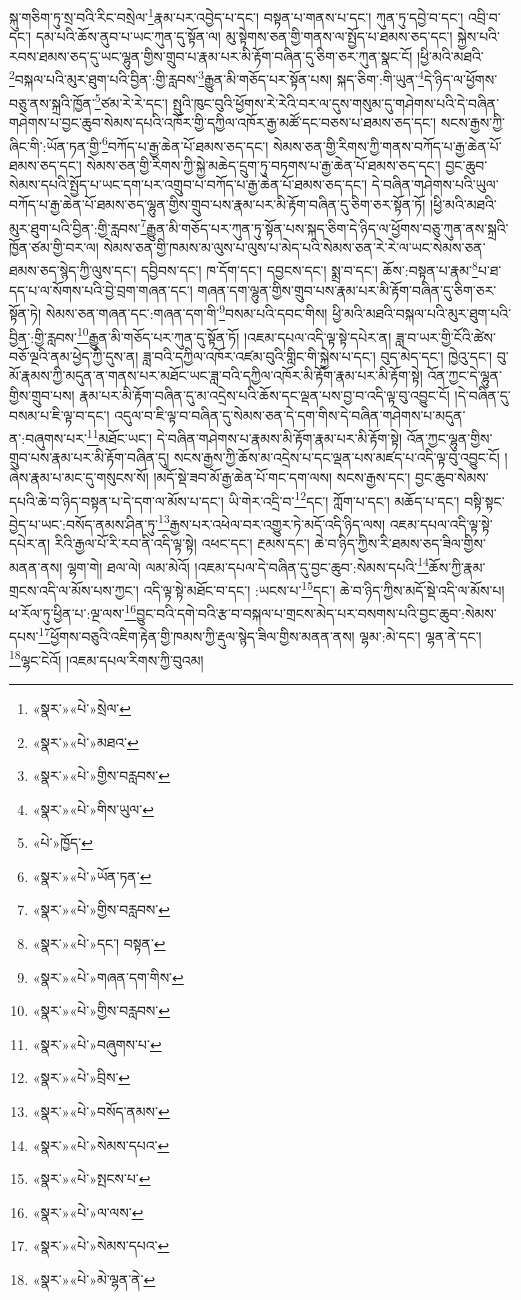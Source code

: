 སྐུ་གཅིག་ཏུ་སྲ་བའི་རིང་བསྲེལ་\footnote{«སྣར་»«པེ་»སྲེལ་}རྣམ་པར་འབྱེད་པ་དང་། བསྟན་པ་གནས་པ་དང་། ཀུན་ཏུ་དབྱེ་བ་དང་། འབྲི་བ་དང་། དམ་པའི་ཆོས་ནུབ་པ་ཡང་ཀུན་དུ་སྟོན་ལ། མུ་སྟེགས་ཅན་གྱི་གནས་ལ་སྤྱོད་པ་ཐམས་ཅད་དང་། སྐྱེས་པའི་རབས་ཐམས་ཅད་དུ་ཡང་ལྷུན་གྱིས་གྲུབ་པ་རྣམ་པར་མི་རྟོག་བཞིན་དུ་ཅིག་ཅར་ཀུན་སྣང་ངོ། །ཕྱི་མའི་མཐའི་\footnote{«སྣར་»«པེ་»མཐའ་}བསྐལ་པའི་མུར་ཐུག་པའི་བྱིན་:གྱི་རླབས་\footnote{«སྣར་»«པེ་»གྱིས་བརླབས་}རྒྱུན་མི་གཅོད་པར་སྟོན་པས། སྐད་ཅིག་:གི་ཡུན་\footnote{«སྣར་»«པེ་»གིས་ཡུལ་}དེ་ཉིད་ལ་ཕྱོགས་བཅུ་ནས་སྐྲའི་ཁྱོན་\footnote{«པེ་»ཁྱོད་}ཙམ་རེ་རེ་དང་། སྤུའི་ཁུང་བུའི་ཕྱོགས་རེ་རེའི་བར་ལ་དུས་གསུམ་དུ་གཤེགས་པའི་དེ་བཞིན་གཤེགས་པ་བྱང་ཆུབ་སེམས་དཔའི་འཁོར་གྱི་དཀྱིལ་འཁོར་རྒྱ་མཚོ་དང་བཅས་པ་ཐམས་ཅད་དང་། སངས་རྒྱས་ཀྱི་ཞིང་གི་:ཡོན་ཏན་གྱི་\footnote{«སྣར་»«པེ་»ཡོན་ཏན་}བཀོད་པ་རྒྱ་ཆེན་པོ་ཐམས་ཅད་དང་། སེམས་ཅན་གྱི་རིགས་ཀྱི་གནས་བཀོད་པ་རྒྱ་ཆེན་པོ་ཐམས་ཅད་དང་། སེམས་ཅན་གྱི་རིགས་ཀྱི་སྐྱེ་མཆེད་དྲུག་ཏུ་བཏགས་པ་རྒྱ་ཆེན་པོ་ཐམས་ཅད་དང་། བྱང་ཆུབ་སེམས་དཔའི་སྤྱོད་པ་ཡང་དག་པར་འགྲུབ་པ་བཀོད་པ་རྒྱ་ཆེན་པོ་ཐམས་ཅད་དང་། དེ་བཞིན་གཤེགས་པའི་ཡུལ་བཀོད་པ་རྒྱ་ཆེན་པོ་ཐམས་ཅད་ལྷུན་གྱིས་གྲུབ་པས་རྣམ་པར་མི་རྟོག་བཞིན་དུ་ཅིག་ཅར་སྟོན་ཏོ། །ཕྱི་མའི་མཐའི་མུར་ཐུག་པའི་བྱིན་:གྱི་རླབས་\footnote{«སྣར་»«པེ་»གྱིས་བརླབས་}རྒྱུན་མི་གཅོད་པར་ཀུན་ཏུ་སྟོན་པས་སྐད་ཅིག་དེ་ཉིད་ལ་ཕྱོགས་བཅུ་ཀུན་ནས་སྐྲའི་ཁྱོན་ཙམ་གྱི་བར་ལ། སེམས་ཅན་གྱི་ཁམས་མ་ལུས་པ་ལུས་པ་མེད་པའི་སེམས་ཅན་རེ་རེ་ལ་ཡང་སེམས་ཅན་ཐམས་ཅད་སྙེད་ཀྱི་ལུས་དང་། དབྱིབས་དང་། ཁ་དོག་དང་། དབྱངས་དང་། སྨྲ་བ་དང་། ཆོས་:བསྟན་པ་རྣམ་\footnote{«སྣར་»«པེ་»དང་། བསྟན་}པ་ཐ་དད་པ་ལ་སོགས་པའི་བྱེ་བྲག་གཞན་དང་། གཞན་དག་ལྷུན་གྱིས་གྲུབ་པས་རྣམ་པར་མི་རྟོག་བཞིན་དུ་ཅིག་ཅར་སྟོན་ཏེ། སེམས་ཅན་གཞན་དང་:གཞན་དག་གི་\footnote{«སྣར་»«པེ་»གཞན་དག་གིས་}བསམ་པའི་དབང་གིས། ཕྱི་མའི་མཐའི་བསྐལ་པའི་མུར་ཐུག་པའི་བྱིན་:གྱི་རླབས་\footnote{«སྣར་»«པེ་»གྱིས་བརླབས་}རྒྱུན་མི་གཅོད་པར་ཀུན་དུ་སྟོན་ཏོ། །འཇམ་དཔལ་འདི་ལྟ་སྟེ་དཔེར་ན། ཟླ་བ་ཡར་གྱི་ངོའི་ཚེས་བཅོ་ལྔའི་ནམ་ཕྱེད་ཀྱི་དུས་ན། ཟླ་བའི་དཀྱིལ་འཁོར་འཛམ་བུའི་གླིང་གི་སྐྱེས་པ་དང་། བུད་མེད་དང་། ཁྱེའུ་དང་། བུ་མོ་རྣམས་ཀྱི་མདུན་ན་གནས་པར་མཐོང་ཡང་ཟླ་བའི་དཀྱིལ་འཁོར་མི་རྟོག་རྣམ་པར་མི་རྟོག་སྟེ། འོན་ཀྱང་དེ་ལྷུན་གྱིས་གྲུབ་པས། རྣམ་པར་མི་རྟོག་བཞིན་དུ་མ་འདྲེས་པའི་ཆོས་དང་ལྡན་པས་བྱ་བ་འདི་ལྟ་བུ་འབྱུང་ངོ། །དེ་བཞིན་དུ་བསམ་པ་ཇི་ལྟ་བ་དང་། འདུལ་བ་ཇི་ལྟ་བ་བཞིན་དུ་སེམས་ཅན་དེ་དག་གིས་དེ་བཞིན་གཤེགས་པ་མདུན་ན་:བཞུགས་པར་\footnote{«སྣར་»«པེ་»བཞུགས་པ་}མཐོང་ཡང་། དེ་བཞིན་གཤེགས་པ་རྣམས་མི་རྟོག་རྣམ་པར་མི་རྟོག་སྟེ། འོན་ཀྱང་ལྷུན་གྱིས་གྲུབ་པས་རྣམ་པར་མི་རྟོག་བཞིན་དུ། སངས་རྒྱས་ཀྱི་ཆོས་མ་འདྲེས་པ་དང་ལྡན་པས་མཛད་པ་འདི་ལྟ་བུ་འབྱུང་ངོ། །ཞེས་རྣམ་པ་མང་དུ་གསུངས་སོ། །མདོ་སྡེ་ཟབ་མོ་རྒྱ་ཆེན་པོ་གང་དག་ལས། སངས་རྒྱས་དང་། བྱང་ཆུབ་སེམས་དཔའི་ཆེ་བ་ཉིད་བསྟན་པ་དེ་དག་ལ་མོས་པ་དང་། ཡི་གེར་འདྲི་བ་\footnote{«སྣར་»«པེ་»བྲིས་}དང་། ཀློག་པ་དང་། མཆོད་པ་དང་། བསྟི་སྟང་བྱེད་པ་ཡང་:བསོད་ནམས་ཤིན་ཏུ་\footnote{«སྣར་»«པེ་»བསོད་ནམས་}རྒྱས་པར་འཕེལ་བར་འགྱུར་ཏེ་མདོ་འདི་ཉིད་ལས། འཇམ་དཔལ་འདི་ལྟ་སྟེ་དཔེར་ན། རིའི་རྒྱལ་པོ་རི་རབ་ནི་འདི་ལྟ་སྟེ། འཕང་དང་། རྔམས་དང་། ཆེ་བ་ཉིད་ཀྱིས་རི་ཐམས་ཅད་ཟིལ་གྱིས་མནན་ནས། ལྷག་གེ། ཐལ་ལེ། ལམ་མེའོ། །འཇམ་དཔལ་དེ་བཞིན་དུ་བྱང་ཆུབ་:སེམས་དཔའི་\footnote{«སྣར་»«པེ་»སེམས་དཔའ་}ཆོས་ཀྱི་རྣམ་གྲངས་འདི་ལ་མོས་པས་ཀྱང་། འདི་ལྟ་སྟེ་མཐོང་བ་དང་། :ཡངས་པ་\footnote{«སྣར་»«པེ་»སྤངས་པ་}དང་། ཆེ་བ་ཉིད་ཀྱིས་མདོ་སྡེ་འདི་ལ་མོས་པ། ཕ་རོལ་ཏུ་ཕྱིན་པ་:ལྔ་ལས་\footnote{«སྣར་»«པེ་»ལ་ལས་}བྱུང་བའི་དགེ་བའི་རྩ་བ་བསྐལ་པ་གྲངས་མེད་པར་བསགས་པའི་བྱང་ཆུབ་:སེམས་དཔས་\footnote{«སྣར་»«པེ་»སེམས་དཔའ་}ཕྱོགས་བཅུའི་འཇིག་རྟེན་གྱི་ཁམས་ཀྱི་རྡུལ་སྙེད་ཟིལ་གྱིས་མནན་ནས། ལྷམ་:མེ་དང་། ལྷན་ནེ་དང་། \footnote{«སྣར་»«པེ་»མེ་ལྷན་ནེ་}ལྷང་ངེའོ། །འཇམ་དཔལ་རིགས་ཀྱི་བུའམ། 